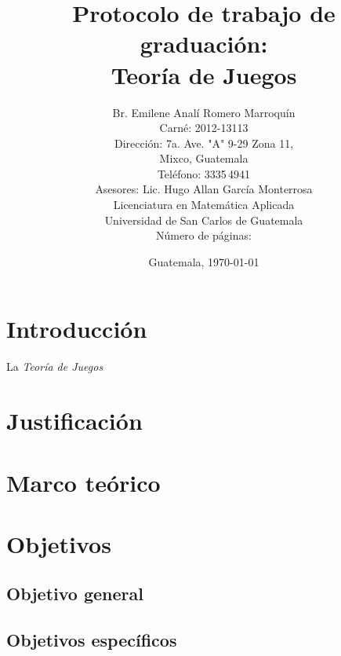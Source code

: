 \documentclass[12pt,letterpaper,titlepage]{article}
\title{Protocolo de trabajo de graduación:\\
Teoría de Juegos}
\author{Br. Emilene Analí Romero Marroquín\\Carné: 2012-13113\\Dirección: 7a. Ave. "A" 9-29 Zona 11,\\Mixco, Guatemala\\Teléfono: 3335\,4941\\Asesores: Lic. Hugo Allan García Monterrosa\\Licenciatura en Matemática Aplicada\\Universidad de San Carlos de Guatemala\\Número de páginas: \pageref{fin}}
\date{Guatemala, \today}
\begin{document}
\maketitle
\setcounter{page}{2}
\tableofcontents

\newpage

\section{Introducción}
La \textit{Teoría de Juegos} 
\newpage

\section{Justificación}





\newpage

\section{Marco teórico}


\newpage

\section{Objetivos}


\subsection{Objetivo general}


\subsection{Objetivos específicos}

\newpage
\end{document}
